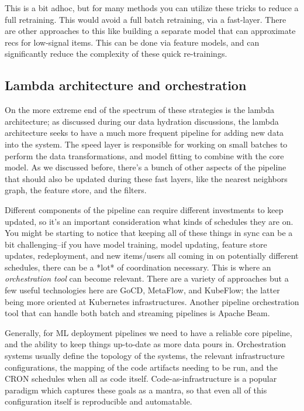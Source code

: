 This is a bit ad\-hoc, but for many methods you can utilize these tricks to reduce a full retraining. This would avoid a full batch retraining, via a fast-layer. There are other approaches to this like building a separate model that can approximate recs for low-signal items. This can be done via feature models, and can significantly reduce the complexity of these quick re-trainings.

\subsection{Lambda architecture and orchestration}

On the more extreme end of the spectrum of these strategies is the lambda architecture; as discussed during our data hydration discussions, the lambda architecture seeks to have a much more frequent pipeline for adding new data into the system. The speed layer is responsible for working on small batches to perform the data transformations, and model fitting to combine with the core model. As we discussed before, there's a bunch of other aspects of the pipeline that should also be updated during these fast layers, like the nearest neighbors graph, the feature store, and the filters. 

Different components of the pipeline can require different investments to keep updated, so it's an important consideration what kinds of schedules they are on. You might be starting to notice that keeping all of these things in sync can be a bit challenging–if you have model training, model updating, feature store updates, redeployment, and new items/users all coming in on potentially different schedules, there can be a *lot* of coordination necessary. This is where an \emph{orchestration tool} can become relevant. There are a variety of approaches but a few useful technologies here are GoCD, MetaFlow, and KubeFlow; the latter being more oriented at Kubernetes infrastructures. Another pipeline orchestration tool that can handle both batch and streaming pipelines is Apache Beam.

Generally, for ML deployment pipelines we need to have a reliable core pipeline, and the ability to keep things up-to-date as more data pours in. Orchestration systems usually define the topology of the systems, the relevant infrastructure configurations, the mapping of the code artifacts needing to be run, and the CRON schedules when all as code itself. Code-as-infrastructure is a popular paradigm which captures these goals as a mantra, so that even all of this configuration itself is reproducible and automatable. 


